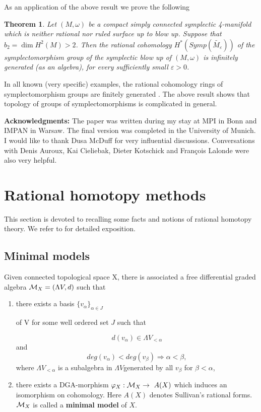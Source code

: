 \documentclass[a4paper,14pt]{article}
\newcommand{\C}[1]{{\cal #1}}
\newcommand{\eps}{{\varepsilon}}
\newcommand{\Mo}{(M,\omega )}
\newcommand{\BS}{{\bigskip}}
\newcommand{\NI}{{\noindent}}
\newtheorem{thm}[theorem]{Theorem}
\numberwithin{equation}{section}
\numberwithin{figure}{section}
\begin{document}
\BS


As an application of the above result we prove the following

\begin{thm}\label{T:infty}
Let $\Mo $ be a compact simply connected
symplectic 4-manifold which is neither
rational nor ruled surface up to blow up. Suppose that
$b_2=\dim H^2(M) > 2$. Then the rational cohomology 
$H^*(Symp(\widetilde {M_{\eps }}))$ of the symplectomorphism
group of the symplectic blow up
of $\Mo $ is infinitely generated (as an algebra),
for every sufficiently small
$\eps > 0$.
\end{thm}


\BS
\NI
In all known (very specific) examples, the rational
cohomology rings of symplectomorphism groups are
finitely generated \cite{ab,am}.  
The above result shows that  topology
of groups of symplectomorphisms is complicated in general.




\BS
\NI
{\bf Acknowledgments:} 
The paper was written during my stay at MPI in Bonn and IMPAN in Warsaw.
The final version was completed in the University of Munich. 
I would like to thank Dusa McDuff for very influential discussions.
Conversations with Denis Auroux, Kai Cieliebak, Dieter Kotschick
and Fran\c cois Lalonde 
were also very helpful.







\section{Rational homotopy methods}\label{S:rat}




This section is devoted to recalling  some facts and notions
of rational homotopy theory. We refer to \cite{ap,fe,fht}
for detailed exposition.



\subsection{Minimal models}\label{SS:mm}

\noindent
Given connected topological space X, there is associated a free differential 
graded algebra $\C M_X =(\Lambda V,d)$ such that

\begin{enumerate}

\item there exists a basis $\{v_{\alpha}\}_{\alpha\in J} $

of V for some well ordered set $J$ such that

%
$$ d(v_\alpha)\in \Lambda V_{<\alpha} $$
and
$$deg(v_\alpha)<deg(v_{\beta})\Rightarrow \alpha<\beta, $$
%
where $ \Lambda V_{<\alpha} $ is a subalgebra in $ \Lambda V $generated by all
$v_\beta $ for $\beta <\alpha $,


\item there exists a DGA-morphism $ \varphi _X:\C M_X\to \ A(X)$ which induces an isomorphism
on cohomology. Here $A(X)$ denotes Sullivan's rational forms.
$\C M_X$ is called a {\bf minimal  model} of $X$.
\end{enumerate}
\end{document}
